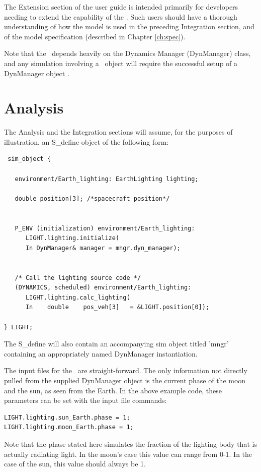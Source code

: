 The Extension section of the user guide is intended primarily for developers
needing to extend the capability of the \earthlightingDesc.  Such users should have a
thorough understanding of how the model is used in the preceding
Integration section, and of the model
specification (described in Chapter \ref{ch:spec}).

Note that the \earthlightingDesc\ depends heavily on the Dynamics Manager
(DynManager) class, and any simulation involving a \earthlightingDesc\ object
will require the successful setup of a DynManager object \cite{dynenv:DYNMANAGER}.

\section{Analysis}

The Analysis and the Integration sections will assume, for the purposes of
illustration, an S\_define object of the following form:

\begin{verbatim}
 sim_object {

   environment/Earth_lighting: EarthLighting lighting;

   double position[3]; /*spacecraft position*/


   P_ENV (initialization) environment/Earth_lighting:
      LIGHT.lighting.initialize(
      In DynManager& manager = mngr.dyn_manager);


   /* Call the lighting source code */
   (DYNAMICS, scheduled) environment/Earth_lighting:
      LIGHT.lighting.calc_lighting(
      In    double    pos_veh[3]   = &LIGHT.position[0]);

} LIGHT;
\end{verbatim}

The S\_define will also contain an accompanying sim object titled 'mngr'
containing an appropriately named DynManager instantiation.

The input files for the \earthlightingDesc\ are straight-forward.
The only information not directly pulled from the supplied DynManager object
is the current phase of the moon and the sun, as seen from
the Earth. In the above example code, these
parameters can be set with the input file commands:

\begin{verbatim}
LIGHT.lighting.sun_Earth.phase = 1;
LIGHT.lighting.moon_Earth.phase = 1;
\end{verbatim}

Note that the phase stated here simulates the fraction of the lighting body
that is actually radiating light. In the moon's case this value can range
from 0-1. In the case of the sun, this value should always be 1.


